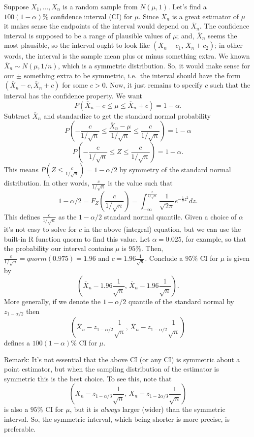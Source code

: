 \documentclass[]{book}
\begin{document}
Suppose \(X_1, \ldots, X_n\) is a random sample from \(N(\mu, 1)\).
Let's find a \(100(1-\alpha)\%\) confidence interval (CI) for \(\mu\).
Since \(\overline X_n\) is a great estimator of \(\mu\) it makes sense
the endpoints of the interval would depend on \(\overline X_n\). The
confidence interval is supposed to be a range of plausible values of
\(\mu\); and, \(\overline X_n\) seems the most plausible, so the
interval ought to look like
\((\overline X_n - c_1, \, \overline X_n + c_2)\); in other words, the
interval is the sample mean plus or minus something extra. We known
\(\overline X_n \sim N(\mu, 1/n)\), which is a symmetric distribution.
So, it would make sense for our \(\pm \text{ something extra}\) to be
symmetric, i.e.~the interval should have the form
\((\overline X_n - c, \overline X_n + c)\) for some \(c>0\). Now, it
just remains to specify \(c\) such that the interval has the confidence
property. We want
\[P(\overline X_n - c \leq \mu \leq \overline X_n +c) = 1-\alpha.\]
Subtract \(\overline X_n\) and standardize to get the standard normal
probability
\[P\left(-\frac{c}{1/\sqrt{n}} \leq \frac{\overline X_n - \mu}{1/\sqrt{n}} \leq \frac{c}{1/\sqrt{n}}\right) = 1-\alpha\]
\[P\left(-\frac{c}{1/\sqrt{n}} \leq Z \leq \frac{c}{1/\sqrt{n}}\right) = 1-\alpha.\]
This means \(P(Z\leq \frac{c}{1/\sqrt{n}}) = 1-\alpha/2\) by symmetry of
the standard normal distribution. In other words,
\(\frac{c}{1/\sqrt{n}}\) is the value such that
\[1-\alpha/2=F_Z(\frac{c}{1/\sqrt{n}})=\int_{-\infty}^{\frac{c}{1/\sqrt{n}}} \frac{1}{\sqrt{2\pi}}e^{-\frac{1}{2}z^2}dz.\]
This defines \(\frac{c}{1/\sqrt{n}}\) as the \(1-\alpha/2\) standard
normal quantile. Given a choice of \(\alpha\) it's not easy to solve for
\(c\) in the above (integral) equation, but we can use the built-in R
function qnorm to find this value. Let \(\alpha = 0.025\), for example,
so that the probability our interval contains \(\mu\) is \(95\%\). Then,
\(\frac{c}{1/\sqrt{n}} = qnorm(0.975) = 1.96\) and
\(c = 1.96\frac{1}{\sqrt{n}}\). Conclude a \(95\%\) CI for \(\mu\) is
given by
\[\left(\overline X_n - 1.96\frac{1}{\sqrt{n}}, \,\overline X_n - 1.96\frac{1}{\sqrt{n}}\right).\]
More generally, if we denote the \(1-\alpha/2\) quantile of the standard
normal by \(z_{1-\alpha/2}\) then
\[\left(\overline X_n - z_{1-\alpha/2}\frac{1}{\sqrt{n}}, \,\overline X_n - z_{1-\alpha/2}\frac{1}{\sqrt{n}}\right)\]
defines a \(100(1-\alpha)\%\) CI for \(\mu\).

Remark: It's not essential that the above CI (or any CI) is symmetric
about a point estimator, but when the sampling distribution of the
estimator is symmetric this is the best choice. To see this, note that
\[\left(\overline X_n - z_{1-\alpha/3}\frac{1}{\sqrt{n}}, \,\overline X_n - z_{1-2\alpha/3}\frac{1}{\sqrt{n}}\right)\]
is also a \(95\%\) CI for \(\mu\), but it is \emph{always} larger
(wider) than the symmetric interval. So, the symmetric interval, which
being shorter is more precise, is preferable.
\end{document}
